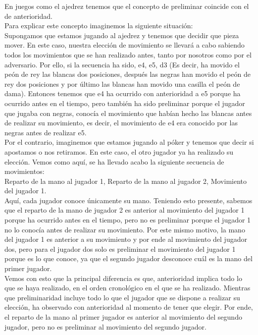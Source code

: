 \documentclass[10pt,a4paper]{book}
\begin{document}
En juegos como el ajedrez tenemos que el concepto de preliminar coincide con el de anterioridad. \\

Para explicar este concepto imaginemos la siguiente situación:\\

Supongamos que estamos jugando al ajedrez y tenemos que decidir que pieza mover. En este caso, nuestra elección de movimiento se llevará a cabo sabiendo todos los movimientos que se han realizado antes, tanto por nosotros como por el adversario. Por ello, si la secuencia ha sido, e4, e5, d3 (Es decir, ha movido el peón de rey las blancas dos posiciones, después las negras han movido el peón de rey dos posiciones y por último las blancas han movido una casilla el peón de dama). Entonces tenemos que e4 ha ocurrido con anterioridad a e5 porque ha ocurrido antes en el tiempo, pero también ha sido preliminar porque el jugador que jugaba con negras, conocía el movimiento que habían hecho las blancas antes de realizar su movimiento, es decir, el movimiento de e4 era conocido por las negras antes de realizar e5.\\

Por el contrario, imaginemos que estamos jugando al póker y tenemos que decir si apostamos o nos retiramos. En este caso, el otro jugador ya ha realizado su elección. Vemos como aquí, se ha llevado acabo la siguiente secuencia de movimientos:\\

Reparto de la mano al jugador 1, Reparto de la mano al jugador 2, Movimiento del jugador 1.\\

Aquí, cada jugador conoce únicamente su mano. Teniendo esto presente, sabemos que el reparto de la mano de jugador 2 es anterior al movimiento del jugador 1 porque ha ocurrido antes en el tiempo, pero no es preliminar porque el jugador 1 no lo conocía antes de realizar su movimiento. Por este mismo motivo, la mano del jugador 1 es anterior a su movimiento y por ende al movimiento del jugador dos, pero para el jugador dos solo es preliminar el movimiento del jugador 1 porque es lo que conoce, ya que el segundo jugador desconoce cuál es la mano del primer jugador.\\

Vemos con esto que la principal diferencia es que, anterioridad implica todo lo que se haya realizado, en el orden cronológico en el que se ha realizado. Mientras que preliminaridad incluye todo lo que el jugador que se dispone a realizar su elección, ha observado con anterioridad al momento de tener que elegir. Por ende, el reparto de la mano al primer jugador es anterior al movimiento del segundo jugador, pero no es preliminar al movimiento del segundo jugador.\\
\end{document}
